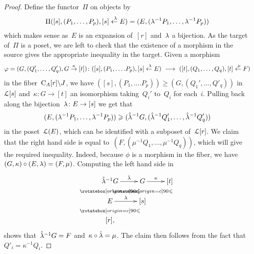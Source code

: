 \begin{proof}
Define the functor~$\Pi$ on objects by 
\begin{gather*}
\Pi([s],(P_1,\dots,P_p),[s]\stackrel{\ \lambda}{\leftarrow} E)=(E,(\lambda^{-1}P_1,\dots,\lambda^{-1}P_p))
\end{gather*}
which makes sense as~$E$ is an expansion of~$[r]$ and~$\lambda$ a bijection. As the target of~$\Pi$ is a poset, we are left to check that the existence of a morphism in the source gives the appropriate inequality in the target. 
Given a morphism
$$\varphi=(G,(Q_1',\dots,Q'_q),G\stackrel{\kappa}\to [t])\colon([s],(P_1,\dots.P_p),[s]\stackrel{\ \lambda}{\leftarrow} E)\ \longrightarrow\ ([t],(Q_1,\dots,Q_q),[t]\stackrel{\ \mu}{\leftarrow} F)$$ 
in the fiber~$\mathrm{C}_A[r]\backslash J$, 
we have $ ([s],(P_1,\dots.P_p))\ge (G,(Q_1',\dots,Q'_q))$
in~$\mathcal{L}[s]$ and~$\kappa\colon G\to [t]$ an isomorphism taking~$Q_i'$ to~$Q_{i}$ for each~$i$.
Pulling back along the bijection~$\lambda\colon E\to [s]$ we get  that
\[
(E,(\lambda^{-1}P_1,\dots,\lambda^{-1}P_p))\geqslant  (\hat{\lambda}^{-1}G,(\hat{\lambda}^{-1}Q_1',\dots,\hat{\lambda}^{-1}Q'_q))
\]
in the poset~$\mathcal{L}(E)$, which can be identified with a subposet of~$\mathcal{L}[r]$. 
We claim that the right hand side is equal to~\hbox{$(F,(\mu^{-1}Q_1,\dots,\mu^{-1}Q_q))$}, which  will give the required inequality. 
Indeed, because $\phi$ is a morphism in the fiber, we have~\hbox{$(G,\kappa)\circ (E,\lambda)=(F,\mu)$}. Computing the left hand side in 
\[
\xymatrix@R-1pc{\hat\la^{-1}G \ar[r]^-{\hat\la} \ar@{}[d]|{\IV} & G \ar[r]^-{\kappa} \ar@{}[d]|{\IV} & [t]\\
E \ar[r]^-{\la} \ar@{}[d]|{\IV} & [s] & \\
[r],&&}
\]
shows that~$\hat{\lambda}^{-1}G=F$ and~$\kappa\circ \hat{\lambda}=\mu$. The claim then follows from the fact that~$Q'_i=\kappa^{-1}Q_i$. 



\end{proof}
